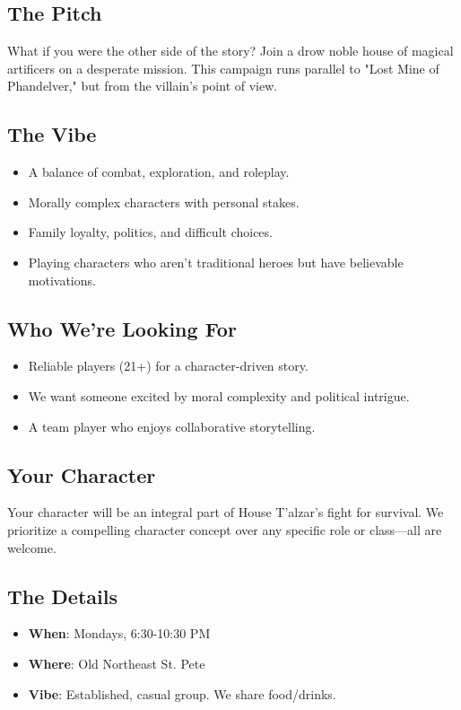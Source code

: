 \documentclass[a4paper, 8pt]{extarticle}
\begin{document}
\color{DrowPurple}


\vspace{2cm}

\subsection*{\textbf{The Pitch}}
What if you were the other side of the story? Join a drow noble house of magical artificers on a desperate mission. This campaign runs parallel to "Lost Mine of Phandelver," but from the villain's point of view.

\subsection*{\textbf{The Vibe}}
\begin{itemize}
    \item A balance of combat, exploration, and roleplay.
    \item Morally complex characters with personal stakes.
    \item Family loyalty, politics, and difficult choices.
    \item Playing characters who aren't traditional heroes but have believable motivations.
\end{itemize}

\subsection*{\textbf{Who We're Looking For}}
\begin{itemize}
    \item Reliable players (21+) for a character-driven story.
    \item We want someone excited by moral complexity and political intrigue.
    \item A team player who enjoys collaborative storytelling.
\end{itemize}

\subsection*{\textbf{Your Character}}
Your character will be an integral part of House T’alzar’s fight for survival. We prioritize a compelling character concept over any specific role or class—all are welcome.

\subsection*{\textbf{The Details}}
\begin{itemize}
    \item \textbf{When}: Mondays, 6:30-10:30 PM
    \item \textbf{Where}: Old Northeast St. Pete
    \item \textbf{Vibe}: Established, casual group. We share food/drinks.
\end{itemize}
\end{document}

